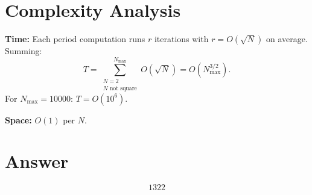 \documentclass[12pt,a4paper]{article}
\begin{document}
\section{Complexity Analysis}

\textbf{Time:} Each period computation runs $r$ iterations with $r = O(\sqrt{N})$ on average. Summing:
\[
T = \sum_{\substack{N=2 \\ N \text{ not square}}}^{N_{\max}} O(\sqrt{N}) = O(N_{\max}^{3/2}).
\]
For $N_{\max} = 10000$: $T = O(10^6)$.

\textbf{Space:} $O(1)$ per $N$.

\section{Answer}

\[
\boxed{1322}
\]
\end{document}
